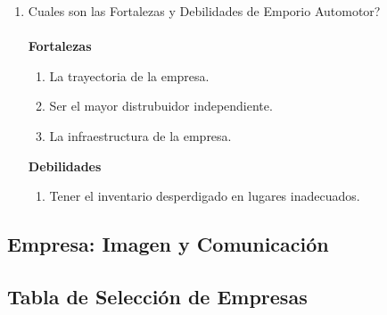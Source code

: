 \documentclass[a4paper,10pt,titlepage]{article}
\begin{document}
\begin{enumerate}
  
  \item Cuales son las Fortalezas y Debilidades de Emporio Automotor?\\ 
    \\ \textbf{Fortalezas }\\
    
    \begin{enumerate}
      \item La trayectoria de la empresa.
      \item Ser el mayor distrubuidor independiente.
      \item La infraestructura de la empresa.
     \end{enumerate}  
    \textbf{Debilidades} \\ 
   \begin{enumerate}
     \item Tener el inventario desperdigado en lugares inadecuados.
  
   \end{enumerate} 
\end{enumerate}

\newpage
\vspace*{\fill}
\begin{center}
\begingroup
\titlerule
\vspace{1cm}
\section{Empresa: Imagen y Comunicaci\'on}
\vspace{1cm}
\titlerule
\endgroup
\end{center}
\vspace*{\fill}

\newpage

\subsection{Tabla de Selecci\'on de Empresas}
\end{document}
